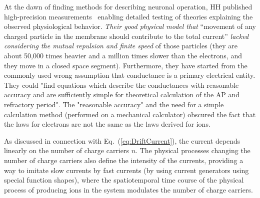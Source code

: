 \fi

\ifx\magyar\undefined
At the dawn of finding methods for describing neuronal operation,
\gls{HH}
published high-precision measurements~\cite{HodgkinHuxley:1952}
enabling detailed testing of theories explaining the observed physiological
behavior. \emph{Their good physical model that }``movement
of any charged particle in the membrane should contribute to the total
current'' \emph{lacked considering the mutual repulsion and finite speed} of those particles (they are about 50,000 times heavier and a million times slower than the electrons, and they move in a closed space segment). Furthermore, 
they have started from the commonly used wrong assumption that conductance
is a primary electrical entity.
They could "find equations which describe the conductances with
reasonable accuracy and are sufficiently simple for theoretical calculation of the \gls{AP} and refractory period".
The "reasonable accuracy" and the need for a simple calculation method (performed on a mechanical calculator) obscured
the fact that the laws for electrons are not the same as the laws derived for ions.

As discussed in connection with Eq.~(\ref{eq:DriftCurrent}),
the current depends linearly on the number of charge carriers $n$.
The physical processes changing the number of charge carriers
also define the intensity of the currents, providing a way to imitate
slow currents by fast currents (by using current generators using special function shapes), where the spatiotemporal time course of the physical process of producing ions in the system modulates the number of charge carriers.
\else

\fi


